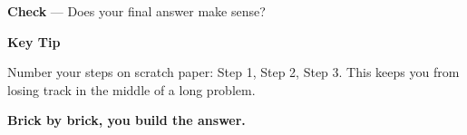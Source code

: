 {\begin{tcolorbox}[
    enhanced,
    colback=funRedLight,
    colframe=funRed!40,
    arc=10pt,
    boxrule=1.5pt,
    left=6mm, right=6mm, top=5mm, bottom=5mm,
]
\textcolor{funRed}{\faArrowDown}\hspace{2mm}\textbf{Check} — Does your final answer make sense?
\end{tcolorbox}

\vspace{3mm}

\begin{tcolorbox}[
    enhanced,
    colback=funYellowLight,
    colframe=funYellow!60,
    arc=10pt,
    boxrule=1pt,
    left=6mm, right=6mm, top=4mm, bottom=4mm,
]
{\bfseries\color{funYellowDark} \faLightbulb\hspace{2mm}Key Tip}

\vspace{2mm}

Number your steps on scratch paper: Step 1, Step 2, Step 3. This keeps you from losing track in the middle of a long problem.
\end{tcolorbox}

\vspace{4mm}

\begin{center}
{\large\bfseries\color{funRedDark} \faPuzzlePiece\hspace{2mm}Brick by brick, you build the answer.\hspace{2mm}\faPuzzlePiece}
\end{center}

}
\newpage
